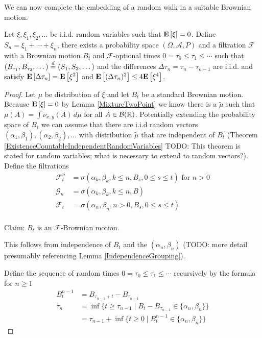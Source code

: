 We can now complete the embedding of a random walk in a suitable Brownian
motion.
\begin{thm}\label{EmbeddingRandomWalkInBrownianMotion}Let $\xi, \xi_1, \xi_2, \dotsc$ be i.i.d. random variables
  such that $\textbf{E}\left[\xi\right] =0$.  Define $S_n = \xi_1 + \dotsb + \xi_n$, there exists a
  probability space $(\Omega, \mathcal{A}, P)$ and a filtration
  $\mathcal{F}$ with a Brownian motion $B_t$ and
  $\mathcal{F}$-optional times $0=\tau_0 \leq \tau_1 \leq \dotsb $
  such that $(B_{\tau_1}, B_{\tau_2}, \dotsc) \overset{d}= (S_1,S_2, \dotsc)$ and
  the differences $\Delta \tau_n = \tau_n - \tau_{n-1}$ are i.i.d. and
  satisfy
  $\textbf{E}\left[\Delta \tau_n\right] = \textbf{E}\left[\xi^2\right]$ and
  $\textbf{E}\left[(\Delta \tau_n)^2\right] \leq 4 \textbf{E}\left[\xi^4\right]$.
\end{thm}
\begin{proof}
Let $\mu$ be distribution of $\xi$ and let $B_t$ be a standard
Brownian motion.  Because $\textbf{E}\left[\xi\right]=0$ by
Lemma \ref{MixtureTwoPoint} we know there is a $\tilde{\mu}$ such that
$\mu(A) = \int \nu_{x,y}(A) \, d\tilde{\mu}$ for all $A \in
\mathcal{B}(\mathbb{R})$.  Potentially extending the probability space of
$B_t$ we can assume that there are i.i.d random vectors
$(\alpha_1, \beta_1), (\alpha_2, \beta_2), \dotsc$ with distribution
$\tilde{\mu}$ that are independent of $B_t$ (Theorem
\ref{ExistenceCountableIndependentRandomVariables} TODO: This theorem
is stated for random variables; what is necessary to extend to random
vectors?).  
Define the filtrations 
\begin{align*}
\mathcal{F}^n_t &= \sigma(\alpha_k,
\beta_k, k \leq n , B_s, 0 \leq s \leq t) \text{ for $n>0$} \\
\mathcal{G}_n &= \sigma(\alpha_k,
\beta_k, k \leq n , B) \\
\mathcal{F}_t &= \sigma(\alpha_n, \beta_n, n >
0, B_s, 0 \leq s \leq t) \\
\end{align*}

Claim: $B_t$ is an $\mathcal{F}$-Brownian motion.

This follows from independence of $B_t$ and the $(\alpha_n, \beta_n)$ (TODO: more detail
presumably referencing Lemma \ref{IndependenceGrouping}).

Define the sequence of random times $0=\tau_0 \leq \tau_1 \leq \dotsb$
recursively by the formula for $n \geq 1$
\begin{align*}
B^{n-1}_t &= B_{\tau_{n-1} + t} - B_{\tau_{n-1}} \\
\tau_n &= \inf \lbrace t \geq \tau_{n-1} \mid B_t - B_{\tau_{n-1}} \in
\lbrace \alpha_n, \beta_n\rbrace \rbrace \\
&=\tau_{n-1} + \inf \lbrace t \geq 0 \mid B^{n-1}_t \in \lbrace \alpha_n, \beta_n\rbrace \rbrace
\end{align*}


\end{proof}
